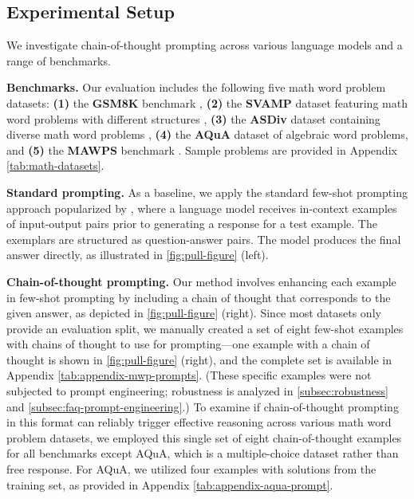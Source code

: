 \subsection{Experimental Setup}

We investigate chain-of-thought prompting across various language models and a range of benchmarks.

\textbf{Benchmarks.}
Our evaluation includes the following five math word problem datasets:
\textbf{(1)} the \textbf{GSM8K} benchmark \citep{cobbe2021training}, 
\textbf{(2)} the \textbf{SVAMP} dataset featuring math word problems with different structures \citep{patel-etal-2021-nlp},
\textbf{(3)} the \textbf{ASDiv} dataset containing diverse math word problems \citep{miao-etal-2020-diverse},
\textbf{(4)} the \textbf{AQuA} dataset of algebraic word problems, and
\textbf{(5)} the \textbf{MAWPS} benchmark \citep{koncel-kedziorski-etal-2016-mawps}. Sample problems are provided in Appendix \cref{tab:math-datasets}.

\textbf{Standard prompting.} As a baseline, we apply the standard few-shot prompting approach popularized by \citet{brown2020language}, where a language model receives in-context examples of input-output pairs prior to generating a response for a test example. The exemplars are structured as question-answer pairs. The model produces the final answer directly, as illustrated in \cref{fig:pull-figure} (left).

\textbf{Chain-of-thought prompting.} Our method involves enhancing each example in few-shot prompting by including a chain of thought that corresponds to the given answer, as depicted in \cref{fig:pull-figure} (right). Since most datasets only provide an evaluation split, we manually created a set of eight few-shot examples with chains of thought to use for prompting—one example with a chain of thought is shown in \cref{fig:pull-figure} (right), and the complete set is available in Appendix \cref{tab:appendix-mwp-prompts}. (These specific examples were not subjected to prompt engineering; robustness is analyzed in \cref{subsec:robustness} and \cref{subsec:faq-prompt-engineering}.) To examine if chain-of-thought prompting in this format can reliably trigger effective reasoning across various math word problem datasets, we employed this single set of eight chain-of-thought examples for all benchmarks except AQuA, which is a multiple-choice dataset rather than free response. For AQuA, we utilized four examples with solutions from the training set, as provided in Appendix \cref{tab:appendix-aqua-prompt}.

